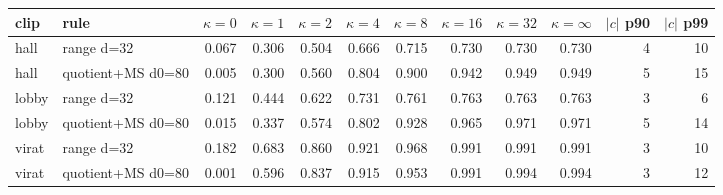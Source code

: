 \begin{tabular}{llrrrrrrrrrr}
\toprule
clip & rule & $\kappa=0$ & $\kappa=1$ & $\kappa=2$ & $\kappa=4$ & $\kappa=8$ & $\kappa=16$ & $\kappa=32$ & $\kappa=\infty$ & $|c|$ p90 & $|c|$ p99 \\
\midrule
hall & range d=32 & 0.067 & 0.306 & 0.504 & 0.666 & 0.715 & 0.730 & 0.730 & 0.730 & 4 & 10 \\
hall & quotient+MS d0=80 & 0.005 & 0.300 & 0.560 & 0.804 & 0.900 & 0.942 & 0.949 & 0.949 & 5 & 15 \\
lobby & range d=32 & 0.121 & 0.444 & 0.622 & 0.731 & 0.761 & 0.763 & 0.763 & 0.763 & 3 & 6 \\
lobby & quotient+MS d0=80 & 0.015 & 0.337 & 0.574 & 0.802 & 0.928 & 0.965 & 0.971 & 0.971 & 5 & 14 \\
virat & range d=32 & 0.182 & 0.683 & 0.860 & 0.921 & 0.968 & 0.991 & 0.991 & 0.991 & 3 & 10 \\
virat & quotient+MS d0=80 & 0.001 & 0.596 & 0.837 & 0.915 & 0.953 & 0.991 & 0.994 & 0.994 & 3 & 12 \\
\bottomrule
\end{tabular}
